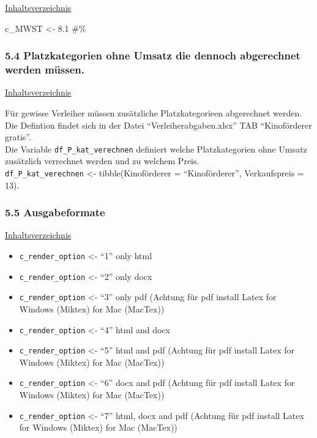 \documentclass[
]{article}
\providecommand{\tightlist}{%
  \setlength{\itemsep}{0pt}\setlength{\parskip}{0pt}}
\begin{document}
\hyperref[Inhaltsverzeichnis]{Inhaltsverzeichnis}

c\_MWST \textless- 8.1 \#\%

\subsubsection{5.4 Platzkategorien ohne Umsatz die dennoch abgerechnet
werden
müssen.}\label{platzkategorien-ohne-umsatz-die-dennoch-abgerechnet-werden-muxfcssen.}

\hyperref[Inhaltsverzeichnis]{Inhaltsverzeichnis}

Für gewisse Verleiher müssen zusätzliche Platzkategorieen abgerechnet
werden. Die Defintion findet sich in der Datei ``Verleiherabgaben.xlsx''
TAB ``Kinoförderer gratis''.\\
Die Variable \texttt{df\_P\_kat\_verechnen} definiert welche
Platzkategorien ohne Umsatz zusätzlich verrechnet werden und zu welchem
Preis.\\
\texttt{df\_P\_kat\_verechnen} \textless- tibble(Kinoförderer =
``Kinoförderer'', Verkaufspreis = 13).

\subsubsection{5.5 Ausgabeformate}\label{ausgabeformate}

\hyperref[Inhaltsverzeichnis]{Inhaltsverzeichnis}

\begin{itemize}
\tightlist
\item
  \texttt{c\_render\_option} \textless- ``1'' only html
\item
  \texttt{c\_render\_option} \textless- ``2'' only docx
\item
  \texttt{c\_render\_option} \textless- ``3'' only pdf (Achtung für pdf
  install Latex for Windows (Miktex) for Mac (MacTex))
\item
  \texttt{c\_render\_option} \textless- ``4'' html and docx
\item
  \texttt{c\_render\_option} \textless- ``5'' html and pdf (Achtung für
  pdf install Latex for Windows (Miktex) for Mac (MacTex))
\item
  \texttt{c\_render\_option} \textless- ``6'' docx and pdf (Achtung für
  pdf install Latex for Windows (Miktex) for Mac (MacTex))
\item
  \texttt{c\_render\_option} \textless- ``7'' html, docx and pdf
  (Achtung für pdf install Latex for Windows (Miktex) for Mac (MacTex))
\end{itemize}
\end{document}
